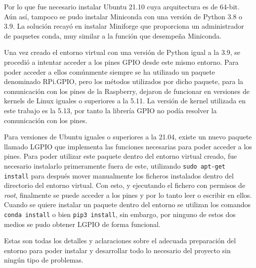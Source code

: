 \documentclass[a4paper, 12pt]{book}
\begin{document}
Por lo que fue necesario instalar Ubuntu 21.10 cuya arquitectura es de 64-bit. Aún así, tampoco se pudo instalar Miniconda con una versión de Python 3.8 o 3.9. La solución recayó en instalar Miniforge que proporciona un administrador de paquetes conda, muy similar a la función que desempeña Miniconda.

Una vez creado el entorno virtual con una versión de Python igual a la 3.9, se procedió a intentar acceder a los pines GPIO desde este mismo entorno. Para poder acceder a ellos comúnmente siempre se ha utilizado un paquete denominado RPi.GPIO, pero los métodos utilizados por dicho paquete, para la comunicación con los pines de la Raspberry, dejaron de funcionar en versiones de kernels de Linux iguales o superiores a la 5.11. La versión de kernel utilizada en este trabajo es la 5.13, por tanto la librería GPIO no podía resolver la comunicación con los pines.

Para versiones de Ubuntu iguales o superiores a la 21.04, existe un nuevo paquete llamado LGPIO que implementa las funciones necesarias para poder acceder a los pines. Para poder utilizar este paquete dentro del entorno virtual creado, fue necesario instalarlo primeramente fuera de este, utilizando \texttt{sudo apt-get install} para después mover manualmente los ficheros instalados dentro del directorio del entorno virtual. Con esto, y ejecutando el fichero con permisos de \textit{root}, finalmente se puede acceder a los pines y por lo tanto leer o escribir en ellos.\\
Cuando se quiere instalar un paquete dentro del entorno se utilizan los comandos \texttt{conda install} o bien \texttt{pip3 install}, sin embargo, por ninguno de estos dos medios se pudo obtener LGPIO de forma funcional.

Estas son todas los detalles y aclaraciones sobre el adecuada preparación del entorno para poder instalar y desarrollar todo lo necesario del proyecto sin ningún tipo de problemas.


\glsaddall
\printglossary[type=\acronymtype,nonumberlist]

\printglossary[nonumberlist]

\end{document}
